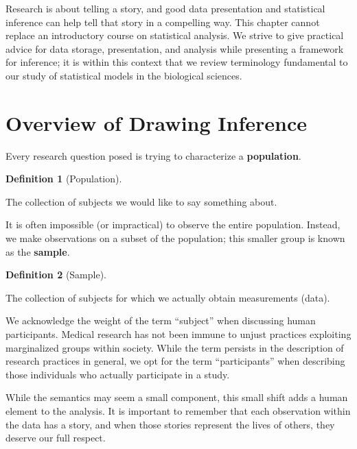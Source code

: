\documentclass[
  letterpaper,
  DIV=11,
  numbers=noendperiod]{scrreprt}
\theoremstyle{definition}
\newtheorem{definition}{Definition}[chapter]
\theoremstyle{definition}
\theoremstyle{remark}
\begin{document}
Research is about telling a story, and good data presentation and
statistical inference can help tell that story in a compelling way. This
chapter cannot replace an introductory course on statistical analysis.
We strive to give practical advice for data storage, presentation, and
analysis while presenting a framework for inference; it is within this
context that we review terminology fundamental to our study of
statistical models in the biological sciences.

\hypertarget{overview-of-drawing-inference}{%
\section{Overview of Drawing
Inference}\label{overview-of-drawing-inference}}

Every research question posed is trying to characterize a
\textbf{population}.

\begin{definition}[Population]\protect\hypertarget{def-population}{}\label{def-population}

The collection of subjects we would like to say something about.

\end{definition}

It is often impossible (or impractical) to observe the entire
population. Instead, we make observations on a subset of the population;
this smaller group is known as the \textbf{sample}.

\begin{definition}[Sample]\protect\hypertarget{def-sample}{}\label{def-sample}

The collection of subjects for which we actually obtain measurements
(data).

\end{definition}

\begin{tcolorbox}[enhanced jigsaw, left=2mm, toprule=.15mm, arc=.35mm, breakable, opacitybacktitle=0.6, opacityback=0, rightrule=.15mm, colbacktitle=quarto-callout-note-color!10!white, coltitle=black, leftrule=.75mm, toptitle=1mm, colframe=quarto-callout-note-color-frame, titlerule=0mm, title=\textcolor{quarto-callout-note-color}{\faInfo}\hspace{0.5em}{Note}, bottomrule=.15mm, colback=white, bottomtitle=1mm]

We acknowledge the weight of the term ``subject'' when discussing human
participants. Medical research has not been immune to unjust practices
exploiting marginalized groups within society. While the term persists
in the description of research practices in general, we opt for the term
``participants'' when describing those individuals who actually
participate in a study.

While the semantics may seem a small component, this small shift adds a
human element to the analysis. It is important to remember that each
observation within the data has a story, and when those stories
represent the lives of others, they deserve our full respect.

\end{tcolorbox}
\end{document}
